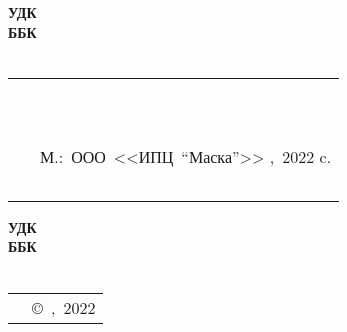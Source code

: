{
\thispagestyle{empty}
%
\small{
\begin{flushleft}
\textbf{%
	УДК\UDK \\
	ББК\BBK \\
	\BibCode \\
}
\end{flushleft}
%
\vspace{3cm}
%
\begin{flushright}
{
\begin{tabular}[c]{>{\raggedright}m{14mm} >{\raggedright}m{95mm} }
	\textbf{\BibCode} & \MyVarAuthorName \tabularnewline
	~ & \MyVarBookName \tabularnewline
	~ & \MyVarBookNamesec \tabularnewline
	~ & М.:~ООО~<<ИПЦ~"`Маска"'>> ,~2022\mdash 128 c. \tabularnewline
	~ & \textbf{\ISBN}
\end{tabular}
}
\end{flushright}
%
\vspace{4.0cm}
%
\begin{flushright}
\textbf{%
	УДК\UDK \\
	ББК\BBK \\
	\BibCode \\
}
\end{flushright}
%
\vspace{1.0cm}
%
}
{
\begin{longtable}[c]{>{\raggedright}m{55mm} >{\raggedleft}m{55mm} }
	\textbf{\ISBN} & {\copyright~\MyVarAuthorName,~2022} \tabularnewline
\end{longtable}
}
}